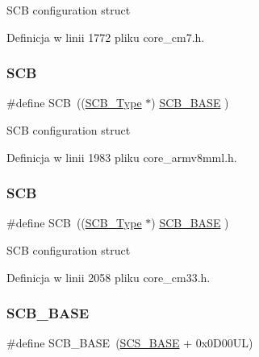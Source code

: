 S\+CB configuration struct 

Definicja w linii 1772 pliku core\+\_\+cm7.\+h.

\mbox{\label{group___c_m_s_i_s__core__base_gaaaf6477c2bde2f00f99e3c2fd1060b01}} 
\subsubsection{\texorpdfstring{S\+CB}{SCB}\hspace{0.1cm}{\footnotesize\ttfamily [11/12]}}
{\footnotesize\ttfamily \#define S\+CB~((\hyperlink{struct_s_c_b___type}{S\+C\+B\+\_\+\+Type}       $\ast$)     \hyperlink{group___c_m_s_i_s__core__base_gad55a7ddb8d4b2398b0c1cfec76c0d9fd}{S\+C\+B\+\_\+\+B\+A\+SE}         )}

S\+CB configuration struct 

Definicja w linii 1983 pliku core\+\_\+armv8mml.\+h.

\mbox{\label{group___c_m_s_i_s__core__base_gaaaf6477c2bde2f00f99e3c2fd1060b01}} 
\subsubsection{\texorpdfstring{S\+CB}{SCB}\hspace{0.1cm}{\footnotesize\ttfamily [12/12]}}
{\footnotesize\ttfamily \#define S\+CB~((\hyperlink{struct_s_c_b___type}{S\+C\+B\+\_\+\+Type}       $\ast$)     \hyperlink{group___c_m_s_i_s__core__base_gad55a7ddb8d4b2398b0c1cfec76c0d9fd}{S\+C\+B\+\_\+\+B\+A\+SE}         )}

S\+CB configuration struct 

Definicja w linii 2058 pliku core\+\_\+cm33.\+h.

\mbox{\label{group___c_m_s_i_s__core__base_gad55a7ddb8d4b2398b0c1cfec76c0d9fd}} 
\subsubsection{\texorpdfstring{S\+C\+B\+\_\+\+B\+A\+SE}{SCB\_BASE}\hspace{0.1cm}{\footnotesize\ttfamily [1/12]}}
{\footnotesize\ttfamily \#define S\+C\+B\+\_\+\+B\+A\+SE~(\hyperlink{group___c_m_s_i_s__core__base_ga3c14ed93192c8d9143322bbf77ebf770}{S\+C\+S\+\_\+\+B\+A\+SE} +  0x0\+D00\+U\+L)}

